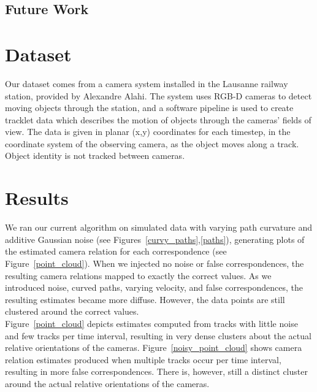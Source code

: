 \documentclass[journal]{IEEEtran}
\begin{document}
	\subsection{Future Work}
\section{Dataset}
	\indent Our dataset comes from a camera system installed in the Lausanne railway station, provided by Alexandre Alahi. The system uses RGB-D cameras to detect moving objects through the station, and a software pipeline is used to create tracklet data which describes the motion of objects through the cameras’ fields of view. The data is given in planar (x,y) coordinates for each timestep, in the coordinate system of the observing camera, as the object moves along a track. Object identity is not tracked between cameras.

\section{Results}
	\indent We ran our current algorithm on simulated data with varying path curvature and additive Gaussian noise (see Figures~\ref{curvy_paths},\ref{paths}), generating plots of the estimated camera relation for each correspondence (see Figure~\ref{point_cloud}). When we injected no noise or false correspondences, the resulting camera relations mapped to exactly the correct values. As we introduced noise, curved paths, varying velocity, and false correspondences, the resulting estimates became more diffuse. However, the data points are still clustered around the correct values. \\
	\indent Figure~\ref{point_cloud} depicts estimates computed from tracks with little noise and few tracks per time interval, resulting in very dense clusters about the actual relative orientations of the cameras. Figure~\ref{noisy_point_cloud} shows camera relation estimates produced when multiple tracks occur per time interval, resulting in more false correspondences. There is, however, still a distinct cluster around the actual relative orientations of the cameras.
\end{document}
